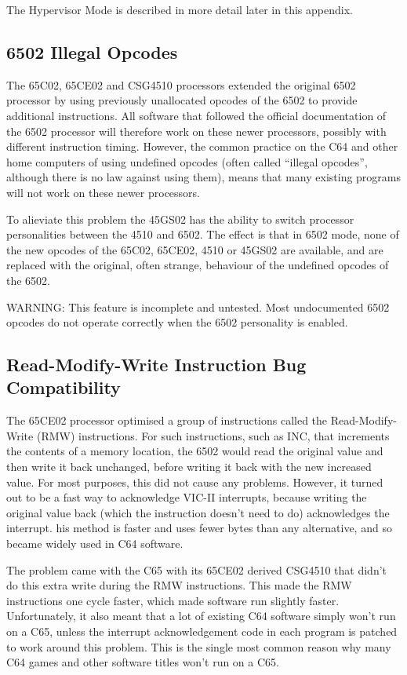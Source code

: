 The Hypervisor Mode is described in more detail later in this appendix.

\subsection{6502 Illegal Opcodes}

The 65C02, 65CE02 and CSG4510 processors extended the original 6502 processor
by using previously unallocated opcodes of the 6502 to provide additional
instructions.  All software that followed the official documentation of the 6502
processor will therefore work on these newer processors, possibly with different
instruction timing.  However, the common practice on the C64 and other home computers
of using undefined opcodes (often called ``illegal opcodes'', although there is no
law against using them), means that many existing programs will not work on these
newer processors.

To alieviate this problem the 45GS02 has the ability to switch processor personalities
between the 4510 and 6502.  The effect is that in 6502 mode, none of the new opcodes of
the 65C02, 65CE02, 4510 or 45GS02 are available, and are replaced with the original,
often strange, behaviour of the undefined opcodes of the 6502.

WARNING: This feature is incomplete and untested.  Most undocumented
6502 opcodes do not operate correctly when the 6502
personality is enabled.

\subsection{Read-Modify-Write Instruction Bug Compatibility}

The 65CE02 processor optimised a group of instructions called the
Read-Modify-Write (RMW) instructions.  For such instructions, such as
INC, that increments the contents of a memory location, the 6502 would
read the original value and then write it back unchanged, before
writing it back with the new increased value.  For most purposes, this
did not cause any problems. However, it turned out to be a fast way to
acknowledge VIC-II interrupts, because writing the original value back
(which the instruction doesn't need to do) acknowledges the interrupt.
his method is faster and uses fewer bytes than any alternative, and so
became widely used in C64 software.

The problem came with the C65 with its 65CE02 derived CSG4510 that
didn't do this extra write
during the RMW instructions.  This made the RMW instructions one cycle
faster, which made
software run slightly faster. Unfortunately, it also meant that a lot
of existing C64 software
simply won't run on a C65, unless the interrupt acknowledgement code in
each program is patched
to work around this problem. This is the single most common reason why
many C64 games and other
software titles won't run on a C65.

